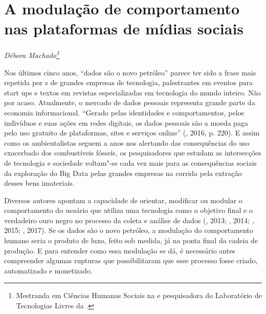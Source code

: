 \chapter*{A modulação de comportamento nas plataformas de mídias sociais}


\begin{flushright}
\emph{Débora Machado\footnote{Mestranda em Ciências Humanas Sociais na  e pesquisadora do Laboratório de Tecnologias Livres da .}}
\end{flushright}

Nos últimos cinco anos, ``dados são o novo petróleo'' parece ter sido a
frase mais repetida por s de grandes empresas de tecnologia,
palestrantes em eventos para start ups e textos em revistas
especializadas em tecnologia do mundo inteiro. Não por acaso.
Atualmente, o mercado de dados pessoais representa grande parte da
economia informacional. ``Gerado pelas identidades e comportamentos,
pelos indivíduos e suas ações em redes digitais, os dados pessoais são a
moeda paga pelo uso gratuito de plataformas, sites e serviços online''
(, 2016, p. 220). E assim como os ambientalistas
seguem a anos nos alertando das consequências do uso exacerbado dos
combustíveis fósseis, os pesquisadores que estudam as intersecções de
tecnologia e sociedade voltam"-se cada vez mais para as consequências
sociais da exploração do Big Data pelas grandes empresas na corrida pela
extração desses bens imateriais.

Diversos autores apontam a capacidade de orientar, modificar ou modular
o comportamento do usuário que utiliza uma tecnologia como o objetivo
final e o verdadeiro ouro negro no processo da coleta e análise de dados
(, 2013; , 2014; , 2015; , 2017). Se os dados são o novo petróleo, a modulação do comportamento humano seria o
produto de luxo, feito sob medida, já na ponta final da cadeia de
produção. E para entender como essa modulação se dá, é necessário antes
compreender algumas rupturas que possibilitaram que esse processo fosse
criado, automatizado e monetizado.

